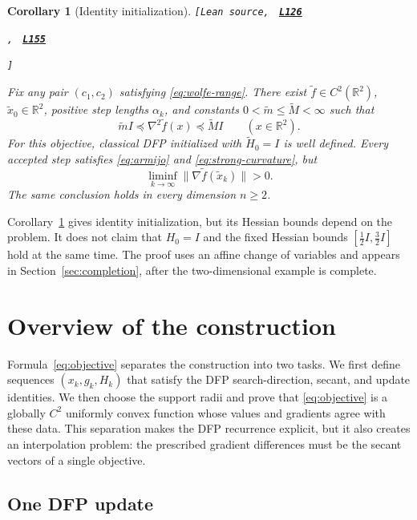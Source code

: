 \documentclass[11pt]{article}
\newtheorem{corollary}[theorem]{Corollary}
\newcommand{\R}{\mathbb R}
\newcommand{\leanLinkText}[1]{%
  \underline{\textbf{#1}}%
}
\newcommand{\leanSnapshot}{e308927f5b7930bdd002f0c0e42b9d112ad821cb}
\newcommand{\leanDeclTag}[2]{%
  {\footnotesize\texttt{[Lean source, }}%
  \href{https://github.com/imathwy/DFP_wolfe_local/blob/\leanSnapshot/#1?plain=1\#L#2}%
    {\leanLinkText{\footnotesize\texttt{L#2}}}%
}
\newcommand{\leanDeclTagExtra}[2]{%
  \unskip
  {\footnotesize\texttt{, }}%
  \href{https://github.com/imathwy/DFP_wolfe_local/blob/\leanSnapshot/#1?plain=1\#L#2}%
    {\leanLinkText{\footnotesize\texttt{L#2}}}\allowbreak
}
\newcommand{\leanDeclTagEnd}{%
  \unskip
  {\footnotesize\texttt{]}}\enspace
}
\begin{document}
\begin{corollary}[Identity initialization]\label{cor:identity-initialization}
\leanDeclTag{DFPWolfe/A_uniformly_convex_counterexample_to_global_convergence_of_DFP_under_weak_Wolfe_/Theorem_Main_theorem.lean}{126}
\leanDeclTagExtra{DFPWolfe/A_uniformly_convex_counterexample_to_global_convergence_of_DFP_under_weak_Wolfe_/Theorem_Main_theorem.lean}{155}
\leanDeclTagEnd
Fix any pair $(c_1,c_2)$ satisfying \eqref{eq:wolfe-range}.  There exist
$\widetilde f\in C^2(\R^2)$, $\widetilde x_0\in\R^2$, positive step lengths $\alpha_k$,
and constants $0<\widetilde m\le \widetilde M<\infty$ such that
\[
\widetilde m I\preceq\nabla^2\widetilde f(x)
\preceq\widetilde M I\qquad(x\in\R^2).
\]
For this objective, classical DFP initialized with $\widetilde H_0=I$ is well
defined.  Every accepted step satisfies \eqref{eq:armijo} and
\eqref{eq:strong-curvature}, but
\[
\liminf_{k\to\infty}\|\nabla\widetilde f(\widetilde x_k)\|>0.
\]
The same conclusion holds in every dimension $n\ge2$.
\end{corollary}

Corollary~\ref{cor:identity-initialization} gives identity initialization, but
its Hessian bounds depend on the problem.  It does not claim that $H_0=I$ and
the fixed Hessian bounds $[\frac12 I,\frac32 I]$ hold at the same time.  The
proof uses an affine change of variables and appears in
Section~\ref{sec:completion}, after the two-dimensional example is complete.

\section{Overview of the construction}
\label{sec:strategy}

Formula~\eqref{eq:objective} separates the construction into two tasks.  We
first define sequences $(x_k,g_k,H_k)$ that satisfy the DFP search-direction,
secant, and update identities.  We then choose the support radii and prove that
\eqref{eq:objective} is a globally $C^2$ uniformly convex function whose
values and gradients agree with these data.  This separation makes the DFP
recurrence explicit, but it also creates an interpolation problem: the
prescribed gradient differences must be the secant vectors of a single
objective.

\subsection{One DFP update}
\end{document}
